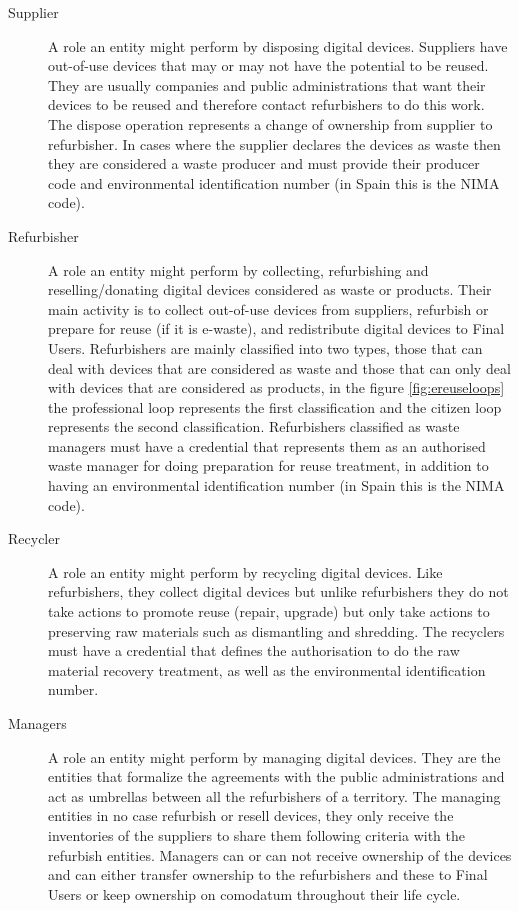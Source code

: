 \documentclass[
]{book}
\begin{document}
\begin{description}
\item[Supplier]
A role an entity might perform by disposing digital devices. Suppliers have out-of-use devices that may or may not have the potential to be reused. They are usually companies and public administrations that want their devices to be reused and therefore contact refurbishers to do this work. The dispose operation represents a change of ownership from supplier to refurbisher. In cases where the supplier declares the devices as waste then they are considered a waste producer and must provide their producer code and environmental identification number (in Spain this is the NIMA code).
\item[Refurbisher]
A role an entity might perform by collecting, refurbishing and reselling/donating digital devices considered as waste or products. Their main activity is to collect out-of-use devices from suppliers, refurbish or prepare for reuse (if it is e-waste), and redistribute digital devices to Final Users. Refurbishers are mainly classified into two types, those that can deal with devices that are considered as waste and those that can only deal with devices that are considered as products, in the figure \ref{fig:ereuseloops} the professional loop represents the first classification and the citizen loop represents the second classification. Refurbishers classified as waste managers must have a credential that represents them as an authorised waste manager for doing preparation for reuse treatment, in addition to having an environmental identification number (in Spain this is the NIMA code).
\item[Recycler]
A role an entity might perform by recycling digital devices. Like refurbishers, they collect digital devices but unlike refurbishers they do not take actions to promote reuse (repair, upgrade) but only take actions to preserving raw materials such as dismantling and shredding. The recyclers must have a credential that defines the authorisation to do the raw material recovery treatment, as well as the environmental identification number.
\item[Managers]
A role an entity might perform by managing digital devices. They are the entities that formalize the agreements with the public administrations and act as umbrellas between all the refurbishers of a territory. The managing entities in no case refurbish or resell devices, they only receive the inventories of the suppliers to share them following criteria with the refurbish entities. Managers can or can not receive ownership of the devices and can either transfer ownership to the refurbishers and these to Final Users or keep ownership on comodatum throughout their life cycle.

\end{description}
\end{document}

